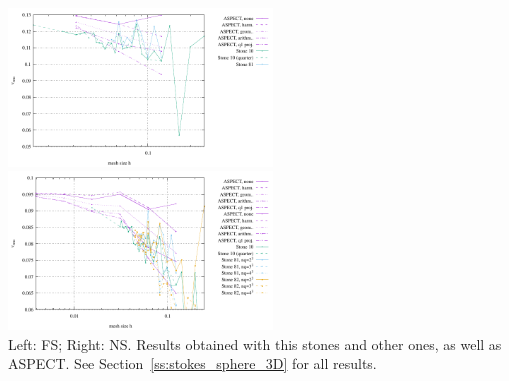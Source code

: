 \begin{center}
\includegraphics[width=7cm]{images/stokes_sphere3D/vrms_FS}
\includegraphics[width=7cm]{images/stokes_sphere3D/vrms_NS}\\
{\captionfont Left: FS; Right: NS. Results obtained with this stones and other ones, as well as ASPECT.
See Section~\ref{ss:stokes_sphere_3D} for all results.}
\end{center}
